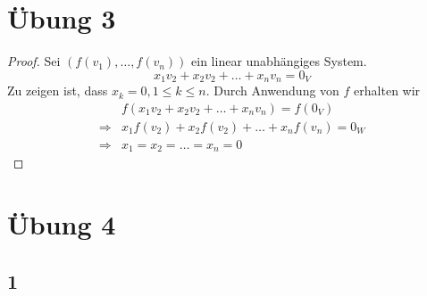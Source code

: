\documentclass[a4paper,10pt]{article}
\begin{document}
\section*{Übung 3}

\begin{proof}
 Sei $(f(v_1), \dots, f(v_n))$ ein linear unabhängiges System.
 \begin{equation}
  x_1v_2 + x_2v_2 + \dots + x_nv_n = 0_V
 \end{equation}
 Zu zeigen ist, dass $x_k = 0, 1 \le k \le n$.
 Durch Anwendung von $f$ erhalten wir
 \begin{align*}
  & f(x_1v_2 + x_2v_2 + \dots + x_nv_n) = f(0_V)\\
  \Rightarrow & x_1f(v_2) + x_2f(v_2) + \dots + x_nf(v_n) = 0_W\\
  \Rightarrow & x_1 = x_2 = \dots = x_n = 0
 \end{align*}
\end{proof}

\section*{Übung 4}

\subsection*{1}
\end{document}
